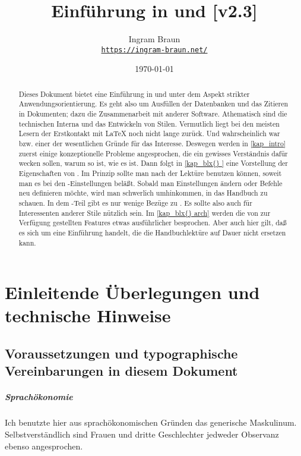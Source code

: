 \documentclass[11pt,table]{scrreprt}
\title{Einführung in \blx{} und \archbib{} [v2.3]}
\author{Ingram Braun\\\href{https://ingram-braun.net/}{\texttt{https://ingram-braun.net/}}}
\date{\today}
\newcommand{\IfTeXforHt}[2]{\ifdefined\HCode#1\else#2\fi} %
\begin{document}
\IfTeXforHt{}{\maketitle}

\begin{abstract}
Dieses Dokument bietet eine Einführung in \blx{} und \archbib{} unter dem Aspekt strikter Anwendungsorientierung. Es geht also um Ausfüllen der
Datenbanken und das Zitieren in Dokumenten; dazu die Zusammenarbeit mit anderer Software. Athematisch sind die technischen Interna und
das Entwickeln von Stilen.
Vermutlich liegt bei den meisten Lesern der Erstkontakt mit \LaTeX{} noch nicht lange zurück. Und wahrscheinlich war \blx{} bzw. \archbib{} einer der wesentlichen Gründe für das Interesse. Deswegen werden in \cref{kap_intro} zuerst einige konzeptionelle Probleme angesprochen, die ein gewisses Verständnis dafür wecken sollen, warum \blx{} so ist, wie es ist. Dann folgt in \cref{kap_blx{} } eine Vorstellung der Eigenschaften von \blx{} . Im Prinzip sollte man nach der Lektüre \blx{} benutzen können, soweit man es bei den -Einstellungen beläßt. Sobald man Einstellungen ändern oder Befehle neu definieren möchte, wird man schwerlich umhinkommen, in das Handbuch zu schauen. In dem \blx{} -Teil gibt es nur wenige Bezüge zu \archbib{} . Es sollte also auch für Interessenten anderer Stile nützlich sein. Im \cref{kap_blx{} arch} werden die von \archbib{} zur Verfügung gestellten Features etwas ausführlicher besprochen. Aber auch hier gilt, daß es sich um eine Einführung handelt, die die Handbuchlektüre auf Dauer nicht ersetzen kann.
\end{abstract}
 
\tableofcontents

\chapter{Einleitende Überlegungen und technische Hinweise}\label{kap_intro}

\section{Voraussetzungen und typographische Vereinbarungen in diesem Dokument}

\paragraph{Sprachökonomie} Ich benutzte hier aus sprachökonomischen Gründen das generische Maskulinum. Selbstverständlich sind Frauen und dritte Geschlechter jedweder Observanz ebenso angesprochen.
\end{document}
